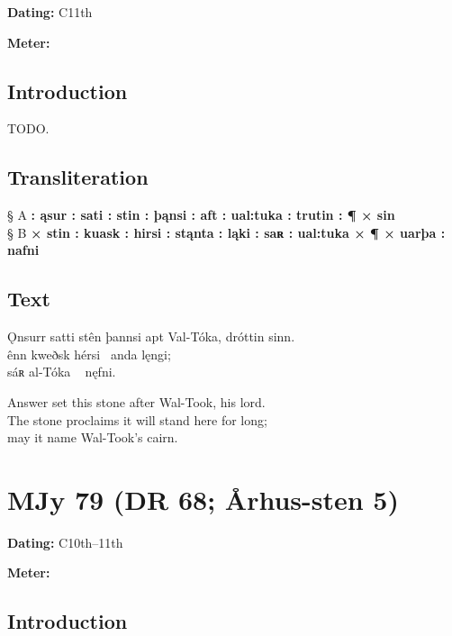 \begin{flushright}%
\textbf{Dating:} C11th

\textbf{Meter:} \Fornyrdislag
\end{flushright}%

\subsection{Introduction}

TODO.

\subsection{Transliteration}

§ A \textbf{: ąsur : sati : stin : þąnsi : aft : ual:tuka : trutin : ¶ × sin} \\
§ B \textbf{× stin : kuask : hirsi : stąnta : ląki : saʀ : ual:tuka × ¶ × uarþa : nafni}

\subsection{Text}

\bpg\bpa[0]%
Ǫnsurr satti stên þannsi apt Val-Tóka, dróttin sinn. \\
ênn kweðsk hérsi \hld\ anda lęngi; \\
sáʀ al-Tóka \hld\  nęfni.\epa

\bpb Answer set this stone after Wal-Took, his lord. \\
The stone proclaims it will stand here for long; \\
may it name Wal-Took’s cairn.\epb\epg

\sectionline\newpage


\section{MJy 79 (DR 68; Århus-sten 5)}

\begin{flushright}%
\textbf{Dating:} C10th--11th

\textbf{Meter:} \Ljodahattr
\end{flushright}%

\subsection{Introduction}

